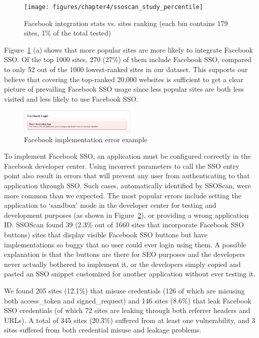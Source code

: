 \begin{figure}[tbh]
\centering
\texttt{[image: figures/chapter4/ssoscan\_study\_percentile]}
\caption{Facebook integration stats vs. sites ranking (each bin contains 179 sites, 1\% of the total tested)}
\label{fig:ssoscan_study_percentile}
\end{figure}

 Figure~\ref{fig:ssoscan_study_percentile} (a) shows that more popular sites are more likely to integrate Facebook SSO.  Of the top 1000 sites, 270 (27\%) of them include Facebook SSO, compared to only 52 out of the 1000 lowest-ranked sites in our dataset.  This supports our believe that covering the top-ranked 20,000 websites is sufficient to get a clear picture of prevailing Facebook SSO usage since less popular sites are both less visited and less likely to use Facebook SSO.

\begin{figure}[bth]
\centering
\includegraphics[width=0.5\textwidth]{figures/chapter4/ssoscan_study_FBError.png}
\caption{Facebook implementation error example}
\label{fig:ssoscan_study_FBError}
\end{figure}

 To implement Facebook SSO, an application must be configured correctly in the Facebook developer center.  Using incorrect parameters to call the SSO entry point also result in errors that will prevent any user from authenticating to that application through SSO.  Such cases, automatically identified by SSOScan, were more common than we expected.  The most popular errors include setting the application to `sandbox' mode in the developer center for testing and development purposes (as shown in Figure~\ref{fig:ssoscan_study_FBError}), or providing a wrong application ID.  SSOScan found 39 (2.3\% out of 1660 sites that incorporate Facebook SSO buttons) sites that display visible Facebook SSO buttons but have implementations so buggy that no user could ever login using them.  A possible explanation is that the buttons are there for SEO purposes and the developers never actually bothered to implement it, or the developers simply copied and pasted an SSO snippet customized for another application without ever testing it.

 We found 205 sites (12.1\%) that misuse credentials (126 of which are misusing both access\_token and signed\_request) and 146 sites (8.6\%) that leak Facebook SSO credentials (of which 72 sites are leaking through both referrer headers and URLs).  A total of 345 sites (20.3\%) suffered from at least one vulnerability, and 3 sites suffered from both credential misuse and leakage problems.

